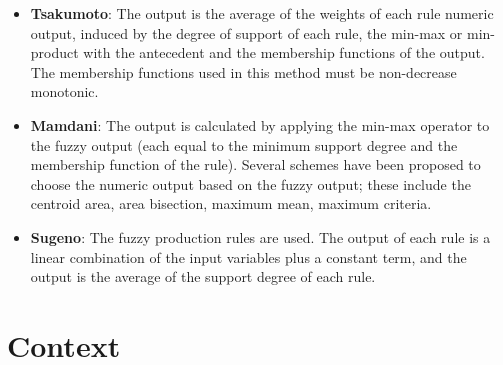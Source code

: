\begin{itemize} 
\item \textbf{Tsakumoto}: The output is the average of the 
weights of each rule numeric output, induced by the degree of 
support of each rule, the min-max or min-product with the 
antecedent and the membership functions of the output. The 
membership functions used in this method must be 
non-decrease monotonic. 
\item \textbf{Mamdani}: The output is calculated by applying 
the min-max operator to the fuzzy output (each equal to the 
minimum support degree and the membership function of the rule). 
Several schemes have been proposed to choose the numeric output 
based on the fuzzy output; these include the centroid area, 
area bisection, maximum mean, maximum criteria.
\item \textbf{Sugeno}: The fuzzy production rules are used. The 
output of each rule is a linear combination of the input 
variables plus a constant term, and the output is the average 
of the support degree of each rule.
\end{itemize} 
\section{Context}

